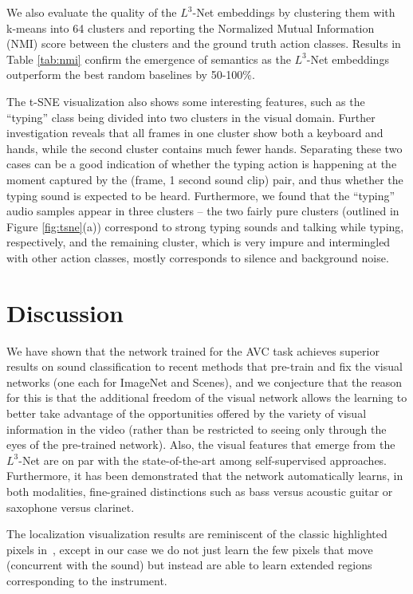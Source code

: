\documentclass[10pt,twocolumn,letterpaper]{article}
\begin{document}
\tabNMI

We also evaluate the quality of the $L^3$-Net embeddings by clustering them
with k-means into 64 clusters and reporting the Normalized Mutual Information
(NMI) score between the clusters and the ground truth action classes.
Results in Table \ref{tab:nmi} confirm the emergence of semantics as
the $L^3$-Net embeddings outperform the best random baselines by 50-100\%.

The t-SNE visualization also shows some interesting features,
such as the ``typing'' class being divided into two clusters in the visual
domain. Further investigation reveals that all frames in one cluster
show both a keyboard and hands, while the second cluster contains
much fewer hands. Separating these two cases can be a good indication of
whether the typing action is happening at the moment captured by the
(frame, 1 second sound clip) pair, and thus whether the typing sound
is expected to be heard. Furthermore, we found that the ``typing''
audio samples appear in three clusters -- the two fairly pure clusters
(outlined in Figure \ref{fig:tsne}(a)) correspond to strong typing sounds
and talking while typing, respectively, and the remaining cluster,
which is very impure and intermingled with other action classes,
mostly corresponds to silence and background noise.

\figUnitsAmap
\figTsne


%
\section{Discussion}

We have shown that the network trained for the AVC task achieves
superior results on sound classification to recent methods
that pre-train and fix the visual networks (one each for ImageNet and Scenes),
and we conjecture that the reason for this is that the additional freedom
of the visual network allows the learning to better take advantage of the 
opportunities offered by the variety of visual information in the video
(rather than be restricted to seeing only through the eyes of the pre-trained
network).
Also, the visual features that emerge from the $L^3$-Net
are on par with the state-of-the-art among self-supervised approaches.
Furthermore,
it has been demonstrated that the network automatically learns,
in both modalities,
fine-grained distinctions such as bass versus acoustic guitar or
saxophone versus clarinet.

The localization visualization results are reminiscent of the classic
highlighted pixels in~\cite{Kidron05}, except in our case we do not just learn
the few pixels that move (concurrent with the sound) but instead are able
to learn extended regions corresponding to the instrument.
\end{document}
